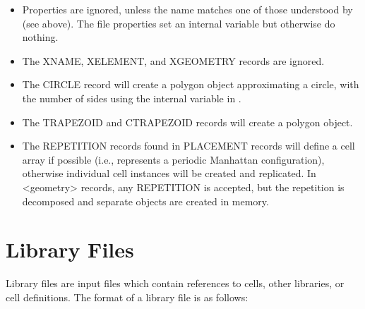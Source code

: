 \begin{itemize}
\item{Properties are ignored, unless the name matches one of those
understood by {\Xic} (see above).  The file properties set an internal
variable but otherwise do nothing.}

\item{The XNAME, XELEMENT, and XGEOMETRY records are ignored.}

\item{The CIRCLE record will create a polygon object approximating a
circle, with the number of sides using the internal variable in
{\Xic}.}

\item{The TRAPEZOID and CTRAPEZOID records will create a polygon object.}

\item{The REPETITION records found in PLACEMENT records will define a
cell array if possible (i.e., represents a periodic Manhattan
configuration), otherwise individual cell instances will be created
and replicated.  In {\vt <geometry>} records, any REPETITION is
accepted, but the repetition is decomposed and separate objects are
created in memory.}
\end{itemize}


\section{Library Files}
\label{libfile}
Library files are {\Xic} input files which contain references to
cells, other libraries, or cell definitions.  The format of a library
file is as follows:

